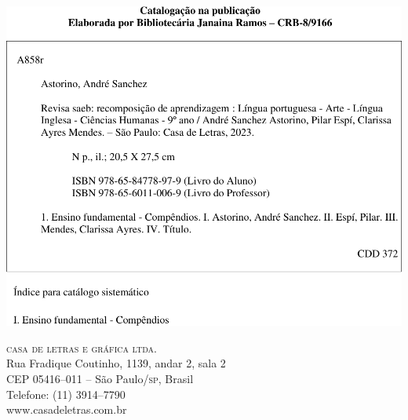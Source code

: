 \noindent\includegraphics[width=.5\textwidth]{../fichas/9POR.png}

\vfill

\textsc{casa de letras e gráfica ltda.}\\
Rua Fradique Coutinho, 1139, andar 2, sala 2\\
CEP 05416--011 -- São Paulo/\textsc{sp}, Brasil\\
Telefone: (11) 3914--7790\\\smallskip
www.casadeletras.com.br\\

\endgroup
\pagebreak
